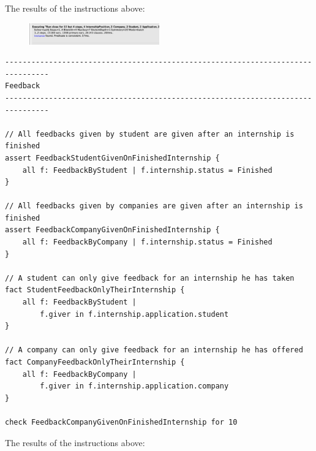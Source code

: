 The results of the instructions above:
\begin{figure}[h!]
    \centering\includegraphics[width=0.5\textwidth]{RASD/Images/Alloy/predfinish.png}
    \label{fig:predfinish}
\end{figure}
\newpage
\begin{verbatim}
--------------------------------------------------------------------------------
Feedback 
--------------------------------------------------------------------------------

// All feedbacks given by student are given after an internship is finished
assert FeedbackStudentGivenOnFinishedInternship {
    all f: FeedbackByStudent | f.internship.status = Finished
}

// All feedbacks given by companies are given after an internship is finished
assert FeedbackCompanyGivenOnFinishedInternship {
    all f: FeedbackByCompany | f.internship.status = Finished
}

// A student can only give feedback for an internship he has taken
fact StudentFeedbackOnlyTheirInternship {
    all f: FeedbackByStudent | 
        f.giver in f.internship.application.student
}

// A company can only give feedback for an internship he has offered
fact CompanyFeedbackOnlyTheirInternship {
    all f: FeedbackByCompany | 
        f.giver in f.internship.application.company
}

check FeedbackCompanyGivenOnFinishedInternship for 10

\end{verbatim}

The results of the instructions above:

